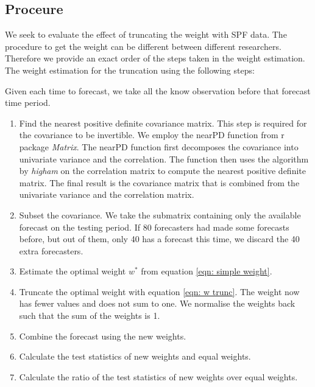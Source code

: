 \documentclass[11pt]{article}
\begin{document}
\subsection{Proceure}\label{proceure}

We seek to evaluate the effect of truncating the weight with SPF data. The procedure to get the weight can be different between different researchers. Therefore we provide an exact order of the steps taken in the weight estimation. The weight estimation for the truncation using the following steps:


Given each time to forecast, we take all the know observation before that forecast time period.

\begin{enumerate}
	\def\labelenumi{\arabic{enumi}.}
	\item
Find the nearest positive definite covariance matrix. This step is required for the covariance to be invertible. We employ the nearPD function from r package \emph{Matrix}. The nearPD function first decomposes the covariance into univariate variance and the correlation. The function then uses the algorithm by \emph{higham} on the correlation matrix to compute the nearest positive definite matrix. The final result is the covariance matrix that is combined from the univariate variance and the correlation matrix.
	\item
Subset the covariance. We take the submatrix containing only the available forecast on the testing period. If 80 forecasters had made some forecasts before, but out of them, only 40 has a forecast this time, we discard the 40 extra forecasters.
	\item
Estimate the optimal weight \(w^*\) from equation
	\ref{eqn: simple weight}.
	\item
	Truncate the optimal weight with equation \ref{eqn: w trunc}. The weight now has fewer values and does not sum to one. We normalise the weights back such that the sum of the weights is 1.
	\item
	Combine the forecast using the new weights.
	\item
	Calculate the test statistics of new weights and equal weights.
	\item
	Calculate the ratio of the test statistics of new weights over equal weights.
\end{enumerate}
\end{document}
